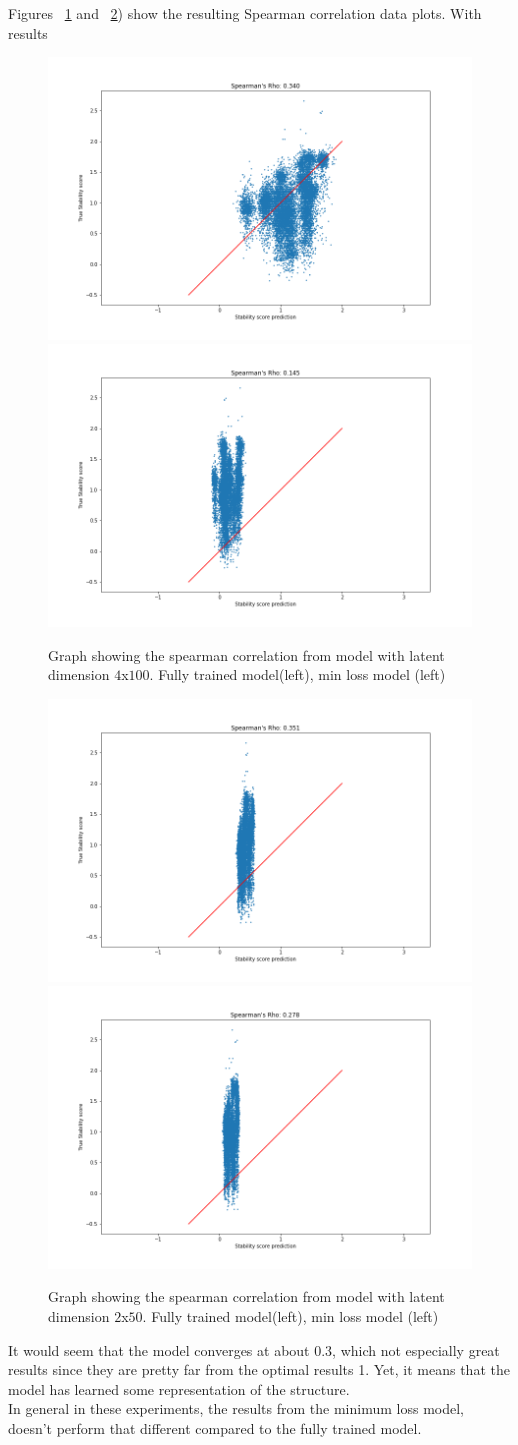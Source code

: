 \noindent
Figures ~\ref{fig:stab_100} and ~\ref{fig:stab_50}) show the resulting Spearman correlation data plots. With results

\begin{figure}[!ht]
  \centering
  \includegraphics[width=0.4\linewidth]{latex/imgs/CNN_spearman_correlation_100_fully.png}
  \includegraphics[width=0.4\linewidth]{latex/imgs/CNN_spearman_correlation_100_best.png}
  \caption{Graph showing the spearman correlation from model with latent dimension $4$x$100$. Fully trained model(left), min loss model (left)}
  \label{fig:stab_100}
\end{figure}

\begin{figure}[!ht]
  \centering
  \includegraphics[width=0.4\linewidth]{latex/imgs/CNN_spearman_correlation_50_fully.png}
  \includegraphics[width=0.4\linewidth]{latex/imgs/CNN_spearman_correlation_50_best.png}
  \caption{Graph showing the spearman correlation from model with latent dimension $2$x$50$. Fully trained model(left), min loss model (left)}
  \label{fig:stab_50}
\end{figure}

\noindent
It would seem that the model converges at about 0.3, which not especially great results since they are pretty far from the optimal results 1. Yet, it means that the model has learned some representation of the structure. \\

\noindent
In general in these experiments, the results from the minimum loss model, doesn't perform that different compared to the fully trained model.